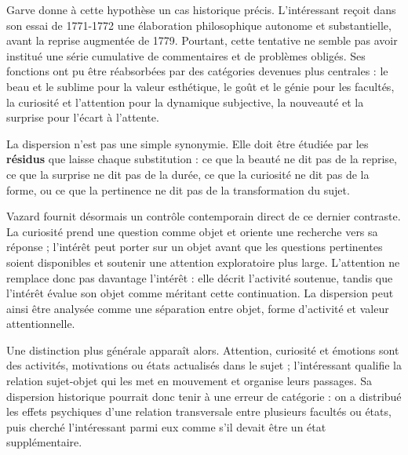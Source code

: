 \documentclass[10pt,a4paper]{article}
\begin{document}
Garve donne à cette hypothèse un cas historique précis. L'intéressant reçoit dans son essai de 1771-1772 une élaboration philosophique autonome et substantielle, avant la reprise augmentée de 1779. Pourtant, cette tentative ne semble pas avoir institué une série cumulative de commentaires et de problèmes obligés. Ses fonctions ont pu être réabsorbées par des catégories devenues plus centrales : le beau et le sublime pour la valeur esthétique, le goût et le génie pour les facultés, la curiosité et l'attention pour la dynamique subjective, la nouveauté et la surprise pour l'écart à l'attente.

La dispersion n'est pas une simple synonymie. Elle doit être étudiée par les \textbf{résidus} que laisse chaque substitution : ce que la beauté ne dit pas de la reprise, ce que la surprise ne dit pas de la durée, ce que la curiosité ne dit pas de la forme, ou ce que la pertinence ne dit pas de la transformation du sujet.

Vazard fournit désormais un contrôle contemporain direct de ce dernier contraste. La curiosité prend une question comme objet et oriente une recherche vers sa réponse ; l'intérêt peut porter sur un objet avant que les questions pertinentes soient disponibles et soutenir une attention exploratoire plus large. L'attention ne remplace donc pas davantage l'intérêt : elle décrit l'activité soutenue, tandis que l'intérêt évalue son objet comme méritant cette continuation. La dispersion peut ainsi être analysée comme une séparation entre objet, forme d'activité et valeur attentionnelle.

Une distinction plus générale apparaît alors. Attention, curiosité et émotions sont des activités, motivations ou états actualisés dans le sujet ; l'intéressant qualifie la relation sujet-objet qui les met en mouvement et organise leurs passages. Sa dispersion historique pourrait donc tenir à une erreur de catégorie : on a distribué les effets psychiques d'une relation transversale entre plusieurs facultés ou états, puis cherché l'intéressant parmi eux comme s'il devait être un état supplémentaire.
\end{document}
